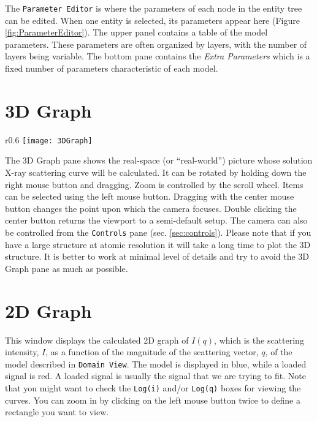 \documentclass[../D+Manual.tex]{subfiles}
\begin{document}
The \texttt{Parameter Editor} is where the parameters of each node in the entity tree can be edited. When one entity is selected, its parameters appear here (Figure \ref{fig:ParameterEditor}). The upper panel contains a table of the model parameters. These parameters are often organized by layers, with the number of layers being variable. The bottom pane contains the \textit{Extra Parameters} which is a fixed number of parameters characteristic of each model.
\newpage
\section{3D Graph} \label{sec:3DGraph}

\begin{wrapfigure}{r}{0.6\textwidth}
	\vspace{-10pt}
	\centering
    \texttt{[image: 3DGraph]}
	\vspace{-10pt}
\end{wrapfigure}

The 3D Graph pane shows the real-space (or ``real-world'') picture whose solution X-ray scattering curve will be calculated. It can be rotated by holding down the right mouse button and dragging. Zoom is controlled by the scroll wheel. Items can be selected using the left mouse button. Dragging with the center mouse button changes the point upon which the camera focuses. Double clicking the center button returns the viewport to a semi-default setup. The camera can also be controlled from the \texttt{Controls} pane (sec. \ref{sec:controls}). Please note that if you have a large structure at atomic resolution it will take a long time to plot the 3D structure. It is better to work at minimal level of details and try to avoid the 3D Graph pane as much as possible.  

\section{2D Graph} \label{sec:2DGraph}

This window displays the calculated 2D graph of $I\left(q\right)$, which is the scattering  intensity, $I$, as a function of the magnitude of the scattering vector, $q$, of the model described in \texttt{Domain View}. The model is displayed in blue, while a loaded signal is red. A loaded signal is usually the signal that we are trying to fit. Note that you might want to check the \texttt{Log(i)} and/or \texttt{Log(q)} boxes for viewing the curves. You can zoom in by clicking on the left mouse button twice to define a rectangle you want to view. 
\end{document}
